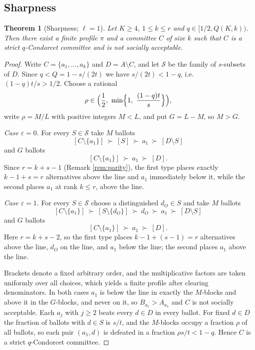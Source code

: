 \documentclass[11pt]{article}
\theoremstyle{plain}
\newtheorem{theorem}{Theorem}
\theoremstyle{definition}
\newcommand{\eps}{\varepsilon}
\begin{document}
\subsection{Sharpness}

\begin{theorem}[Sharpness; $\ell=1$]
\label{thm:sharp}
Let $K\ge4$, $1\le k\le r$ and $q\in[1/2,Q(K,k))$. Then there exist a finite profile $\pi$ and a committee $C$ of size $k$ such that $C$ is a strict $q$-Condorcet committee and is not socially acceptable.
\end{theorem}

\begin{proof}
Write $C=\{a_1,\dots,a_k\}$ and $D=A\setminus C$, and let $\mathcal S$ be the family of $s$-subsets of $D$. Since $q<Q=1-s/(2t)$ we have $s/(2t)<1-q$, i.e.\ $(1-q)t/s>1/2$. Choose a rational
\[
\rho\in\Bigl(\frac12,\ \min\Bigl\{1,\ \frac{(1-q)t}{s}\Bigr\}\Bigr),
\]
write $\rho=M/L$ with positive integers $M<L$, and put $G=L-M$, so $M>G$.

\emph{Case $\eps=0$.} For every $S\in\mathcal S$ take $M$ ballots
\[
[C\setminus\{a_1\}]\ \succ\ [S]\ \succ\ a_1\ \succ\ [D\setminus S]
\]
and $G$ ballots
\[
[C\setminus\{a_1\}]\ \succ\ a_1\ \succ\ [D].
\]
Since $r=k+s-1$ (Remark \ref{rem:parity}), the first type places exactly $k-1+s=r$ alternatives above the line and $a_1$ immediately below it, while the second places $a_1$ at rank $k\le r$, above the line.

\emph{Case $\eps=1$.} For every $S\in\mathcal S$ choose a distinguished $d_O\in S$ and take $M$ ballots
\[
[C\setminus\{a_1\}]\ \succ\ [S\setminus\{d_O\}]\ \succ\ d_O\ \succ\ a_1\ \succ\ [D\setminus S]
\]
and $G$ ballots
\[
[C\setminus\{a_1\}]\ \succ\ a_1\ \succ\ [D].
\]
Here $r=k+s-2$, so the first type places $k-1+(s-1)=r$ alternatives above the line, $d_O$ on the line, and $a_1$ below the line; the second places $a_1$ above the line.

Brackets denote a fixed arbitrary order, and the multiplicative factors are taken uniformly over all choices, which yields a finite profile after clearing denominators. In both cases $a_1$ is below the line in exactly the $M$-blocks and above it in the $G$-blocks, and never on it, so $B_{a_1}>A_{a_1}$ and $C$ is not socially acceptable. Each $a_j$ with $j\ge2$ beats every $d\in D$ in every ballot. For fixed $d\in D$ the fraction of ballots with $d\in S$ is $s/t$, and the $M$-blocks occupy a fraction $\rho$ of all ballots, so each pair $(a_1,d)$ is defeated in a fraction $\rho s/t<1-q$. Hence $C$ is a strict $q$-Condorcet committee.
\end{proof}
\end{document}
